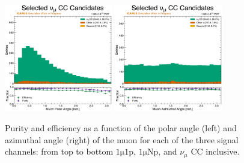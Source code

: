 \begin{figure}[!htb]
    \\
    \includegraphics[width=0.42\textwidth]{figures/neutrino_selection/selected_hist1d_1muX_muon_polar_angle.pdf}
    \includegraphics[width=0.42\textwidth]{figures/neutrino_selection/selected_hist1d_1muX_muon_azimuthal_angle.pdf}
    \caption{Purity and efficiency as a function of the polar angle (left) and azimuthal angle (right) of the muon for each of the three signal channels: from top to bottom $\mathrm{1\mu 1p}$, $\mathrm{1\mu Np}$, and $\nu_\mu$ CC inclusive.}
    \label{fig:pureff_muon_angles}
\end{figure}

